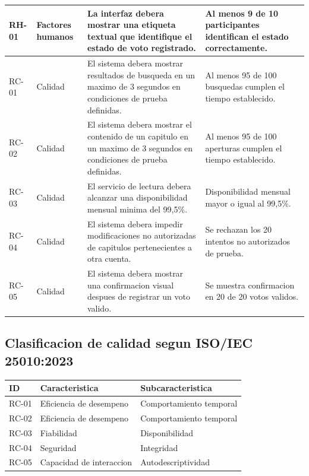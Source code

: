 \documentclass[11pt,a4paper]{article}
\begin{document}
\begin{longtable}{|p{1.1cm}|p{1.6cm}|p{5.1cm}|p{5.1cm}|}
RH-01 & Factores humanos &
La interfaz debera mostrar una etiqueta
textual que identifique el estado
de voto registrado. &
Al menos 9 de 10 participantes
identifican el estado correctamente. \\ \hline

RC-01 & Calidad &
El sistema debera mostrar resultados
de busqueda en un maximo de 3 segundos
en condiciones de prueba definidas. &
Al menos 95 de 100 busquedas
cumplen el tiempo establecido. \\ \hline

RC-02 & Calidad &
El sistema debera mostrar el contenido
de un capitulo en un maximo de 3 segundos
en condiciones de prueba definidas. &
Al menos 95 de 100 aperturas
cumplen el tiempo establecido. \\ \hline

RC-03 & Calidad &
El servicio de lectura debera alcanzar
una disponibilidad mensual minima
del 99,5\%. &
Disponibilidad mensual mayor o
igual al 99,5\%. \\ \hline

RC-04 & Calidad &
El sistema debera impedir modificaciones
no autorizadas de capitulos
pertenecientes a otra cuenta. &
Se rechazan los 20 intentos
no autorizados de prueba. \\ \hline

RC-05 & Calidad &
El sistema debera mostrar una
confirmacion visual despues
de registrar un voto valido. &
Se muestra confirmacion en
20 de 20 votos validos. \\ \hline

\end{longtable}
\normalsize

\subsection{Clasificacion de calidad segun ISO/IEC 25010:2023}\cite{iso25010}

\begin{center}
\small
\begin{tabular}{|p{1.4cm}|p{4.7cm}|p{5.5cm}|}
\hline
\textbf{ID} &
\textbf{Caracteristica} &
\textbf{Subcaracteristica} \\ \hline

RC-01 & Eficiencia de desempeno &
Comportamiento temporal \\ \hline

RC-02 & Eficiencia de desempeno &
Comportamiento temporal \\ \hline

RC-03 & Fiabilidad &
Disponibilidad \\ \hline

RC-04 & Seguridad &
Integridad \\ \hline

RC-05 & Capacidad de interaccion &
Autodescriptividad \\ \hline

\end{tabular}
\end{center}
\end{document}
